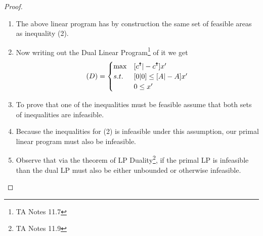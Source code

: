 \documentclass{article}
\begin{document}
\begin{proof}
\begin{enumerate}
            program\footnote{TA Notes 11.1} of the form 
            \[ (I_1) = \begin{cases} 
                  \max & 0^{\text{\Cross{}}} y \\
                  s.t. & A^{\text{\Cross{}}} y \leq c  \\
                  & - A^{\text{\Cross{}}} y \leq -c  \\
                  & 0 \leq y
               \end{cases} = \begin{cases}
                  \max & 0^{\text{\Cross{}}} y \\
                  s.t. & \begin{bmatrix} A^{\text{\Cross{}}} \\ - A^{\text{\Cross{}}}
                  \end{bmatrix} y \leq \begin{bmatrix}
                        c \\ -c
                  \end{bmatrix}  \\
                  & 0 \leq y
               \end{cases}
            \]
            \item The above linear program has by construction the same set of feasible
            areas as inequality (2). 
            \item Now writing out the Dual Linear Program\footnote{TA Notes 11.7} of it we
            get \[
              (D) = \begin{cases}
                    \max &  [c^{\text{\Cross{}}} | -c^{\text{\Cross{}}}] x^{\prime} \\
                    s.t. & [0 | 0] \leq [A | -A] x^{\prime} \\
                  & 0 \leq x^{\prime}
              \end{cases}    
            \]
            \item To prove that one of the inequalities must be feasible assume that both
            sets of inequalities are infeasible. 
            \item Because the inequalities for (2) is infeasible under this assumption,
            our primal linear program must also be infeasible. 
            \item Observe that via the theorem of LP Duality\footnote{TA Notes 11.9}, if
            the primal LP is infeasible than the dual LP must also be either unbounded or
            otherwise infeasible. 

\end{enumerate}
\end{proof}
\end{document}
